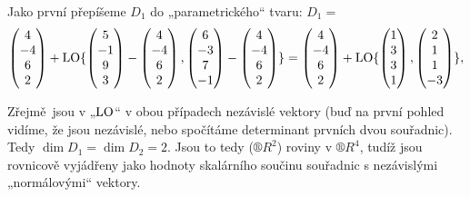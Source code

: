 \documentclass[12pt]{article}                   %
\begin{document}
\begin{priklad}[7.7]
	\begin{reseni}
		Jako první přepíšeme $D_1$ do „parametrického“ tvaru: $D_1 = $
		$$ \begin{pmatrix} 4 \\ -4 \\ 6 \\ 2 \end{pmatrix} + \operatorname{LO}\{\begin{pmatrix} 5 \\ -1 \\ 9 \\ 3 \end{pmatrix} - \begin{pmatrix} 4 \\ -4 \\ 6 \\ 2 \end{pmatrix}, \begin{pmatrix} 6 \\ -3 \\ 7 \\ -1 \end{pmatrix} - \begin{pmatrix} 4 \\ -4 \\ 6 \\ 2 \end{pmatrix}\} = \begin{pmatrix} 4 \\ -4 \\ 6 \\ 2 \end{pmatrix} + \operatorname{LO}\{\begin{pmatrix} 1 \\ 3 \\ 3 \\ 1 \end{pmatrix}, \begin{pmatrix} 2 \\ 1 \\ 1 \\ -3 \end{pmatrix}\}, $$

		Zřejmě jsou v „$\operatorname{LO}$“ v obou případech nezávislé vektory (buď na první pohled vidíme, že jsou nezávislé, nebo spočítáme determinant prvních dvou souřadnic). Tedy $\dim D_1 = \dim D_2 = 2$. Jsou to tedy ($®R^2$) roviny v $®R^4$, tudíž jsou rovnicově vyjádřeny jako hodnoty skalárního součinu souřadnic s nezávislými „normálovými“ vektory.


\end{reseni}
\end{priklad}
\end{document}
